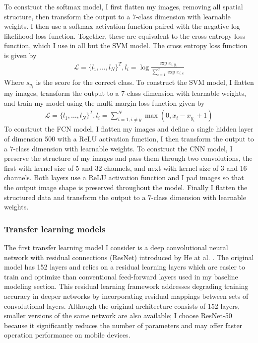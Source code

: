 \documentclass[10pt,twocolumn,letterpaper]{article}
\begin{document}
To construct the softmax model, I first flatten my images, removing all spatial structure, then transform the output to a 7-class dimension with learnable weights. I then use a softmax activation function paired with the negative log likelihood loss function. Together, these are equivalent to the cross entropy loss function, which I use in all but the SVM model. The cross entropy loss function is given by
\begin{align}
  \mathcal{L} = \{l_1, \dots, l_N\}^T, l_i = \log\frac{\exp{x_{i, y_i}}}{\sum_{c=1}^C\exp{x_{i,c}}}
\end{align}
Where $s_{y_i}$ is the score for the correct class. 
To construct the SVM model, I flatten my images, transform the output to a 7-class dimension with learnable weights, and train my model using the multi-margin loss function given by
\begin{align}
  \mathcal{L} = \{l_1, \dots, l_N\}^T, l_i = \sum_{i=1, i\neq y}^N \max(0, x_{i} - x_{y_i} + 1)
\end{align}
To construct the FCN model, I flatten my images and define a single hidden layer of dimension 500 with a ReLU activation function, I then transform the output to a 7-class dimension with learnable weights. To construct the CNN model, I preserve the structure of my images and pass them through two convolutions, the first with kernel size of 5 and 32 channels, and next with kernel size of 3 and 16 channels. Both layers use a ReLU activation function and I pad images so that the output image shape is preserved throughout the model. Finally I flatten the structured data and transform the output to a 7-class dimension with learnable weights. 

\subsubsection{Transfer learning models}
The first transfer learning model I consider is a deep convolutional neural network with residual connections (ResNet) introduced by He at al. \cite{ResNET}. The original model has 152 layers and relies on a residual learning layers which are easier to train and optimize than conventional feed-forward layers used in my baseline modeling section. This residual learning framework addresses degrading training accuracy in deeper networks by incorporating residual mappings between sets of convolutional layers. Although the original architecture consists of 152 layers, smaller versions of the same network are also available; I choose ResNet-50 because it significantly reduces the number of parameters and may offer faster operation performance on mobile devices. 
\end{document}

